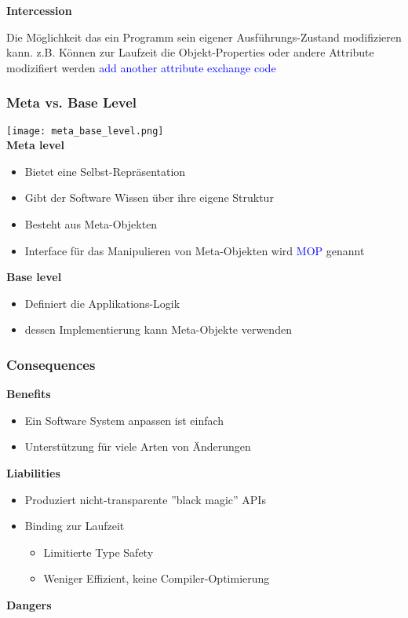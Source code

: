 \textbf{Intercession}

Die Möglichkeit das ein Programm sein eigener Ausführungs-Zustand modifizieren kann. z.B. Können zur Laufzeit die Objekt-Properties oder andere Attribute modizifiert werden \textcolor{blue}{add another attribute} \textcolor{blue}{exchange code}

\subsubsection{Meta vs. Base Level}

\texttt{[image: meta\_base\_level.png]} \\

\textbf{Meta level}
\begin{itemize}
    \item Bietet eine Selbst-Repräsentation
    \item Gibt der Software Wissen über ihre eigene Struktur
    \item Besteht aus Meta-Objekten
    \item Interface für das Manipulieren von Meta-Objekten wird \textcolor{blue}{MOP} genannt
\end{itemize}
\vspace{10pt}
\textbf{Base level}
\begin{itemize}
    \item Definiert die Applikations-Logik
    \item dessen Implementierung kann Meta-Objekte verwenden
\end{itemize}

\subsubsection{Consequences}
\textbf{Benefits}
\begin{itemize}
    \item Ein Software System anpassen ist einfach
    \item Unterstützung für viele Arten von Änderungen
\end{itemize}
\vspace{10pt}
\textbf{Liabilities}
\begin{itemize}
    \item Produziert nicht-transparente ''black magic'' APIs
    \item Binding zur Laufzeit
    \begin{itemize}
        \item Limitierte Type Safety
        \item Weniger Effizient, keine Compiler-Optimierung
    \end{itemize}
\end{itemize}
\vspace{10pt}
\textbf{Dangers}

